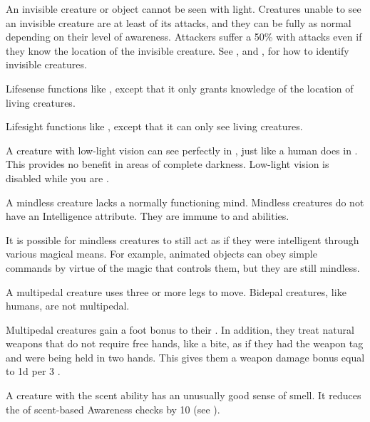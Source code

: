         An invisible creature or object cannot be seen with light.
        Creatures unable to see an invisible creature are at least \partiallyunaware of its attacks, and they can be fully \unaware as normal depending on their level of awareness.
        Attackers suffer a 50\%  with  attacks even if they know the location of the invisible creature.
        See , and , for how to identify invisible creatures.

        Lifesense functions like , except that it only grants knowledge of the location of living creatures.

        Lifesight functions like , except that it can only see living creatures.

        A creature with low-light vision can see perfectly in , just like a human does in .
        This provides no benefit in areas of complete darkness.
        Low-light vision is disabled while you are \dazzled.

        A mindless creature lacks a normally functioning mind.
        Mindless creatures do not have an Intelligence attribute.
        They are immune to  and  abilities.

        It is possible for mindless creatures to still act as if they were intelligent through various magical means.
        For example, animated objects can obey simple commands by virtue of the magic that controls them, but they are still mindless.

        A multipedal creature uses three or more legs to move.
        Bidepal creatures, like humans, are not multipedal.

        Multipedal creatures gain a  foot bonus to their .
        In addition, they treat natural weapons that do not require free hands, like a bite, as if they had the  weapon tag and were being held in two hands.
        This gives them a weapon damage bonus equal to \plus1d per 3 .

        A creature with the scent ability has an unusually good sense of smell.
        It reduces the  of scent-based Awareness checks by 10 (see ).

